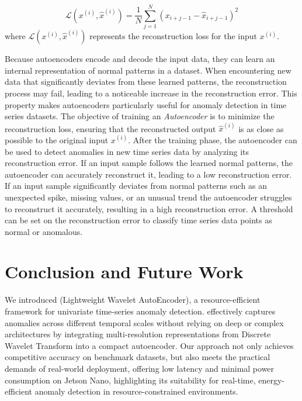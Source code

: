 \begin{equation}
    \mathcal{L}(x^{(i)},\hat{x}^{(i)}) = \frac{1}{N}\sum_{j=1}^N(x_{i+j-1} - \hat{x}_{i+j-1})^2
    \label{eq:error}
\end{equation}
where \( \mathcal{L}(x^{(i)},\hat{x}^{(i)}) \) represents the reconstruction loss for the input \( x^{(i)} \). 

Because autoencoders encode and decode the input data, they can learn an
internal representation of normal patterns in a dataset. When encountering new
data that significantly deviates from these learned patterns, the reconstruction
process may fail, leading to a noticeable increase in the reconstruction error. This
property makes autoencoders particularly useful for anomaly detection in time
series datasets. The objective of training an {\em Autoencoder} is to minimize the
reconstruction loss, ensuring that the reconstructed output \( \hat{x}^{(i)} \)
is as close as possible to the original input \( x^{(i)} \). After the training
phase, the autoencoder can be used to detect anomalies in new time series data
by analyzing its reconstruction error. If an input sample follows the learned
normal patterns, the autoencoder can accurately reconstruct it, leading to a low
reconstruction error. If an input sample significantly deviates from normal
patterns such as an unexpected spike, missing values, or an unusual trend the
autoencoder struggles to reconstruct it accurately, resulting in a high
reconstruction error. A threshold can be set on the reconstruction error to
classify time series data points as normal or anomalous.

 


\section{Conclusion and Future Work}
\label{sec:conclusion}
We introduced \fname{} (Lightweight Wavelet AutoEncoder), a resource-efficient framework for univariate time-series anomaly detection. \fname{} effectively captures anomalies across different temporal scales without relying on deep or complex architectures by integrating multi-resolution representations from Discrete Wavelet Transform into a compact autoencoder. Our approach not only achieves competitive accuracy on benchmark datasets, but also meets the practical demands of real-world deployment, offering low latency and minimal power consumption on Jetson Nano, highlighting its suitability for real-time, energy-efficient anomaly detection in resource-constrained environments.

